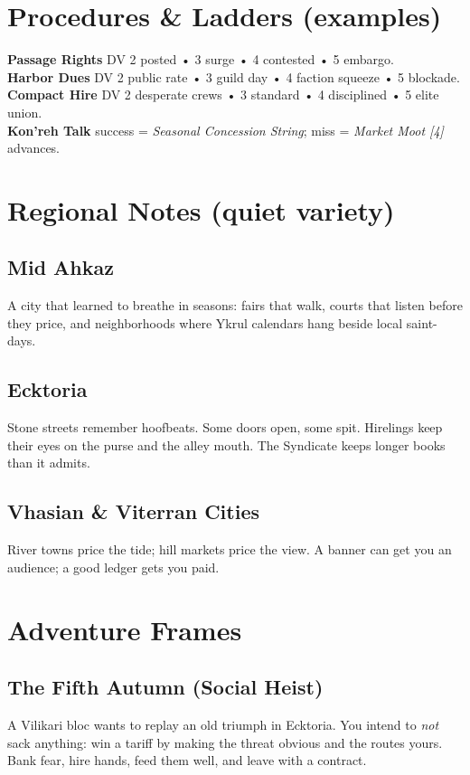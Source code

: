 \documentclass[11pt,letterpaper]{article}
\begin{document}
\section{Procedures \& Ladders (examples)}
\textbf{Passage Rights} DV 2 posted • 3 surge • 4 contested • 5 embargo.\\
\textbf{Harbor Dues} DV 2 public rate • 3 guild day • 4 faction squeeze • 5 blockade.\\
\textbf{Compact Hire} DV 2 desperate crews • 3 standard • 4 disciplined • 5 elite union.\\
\textbf{Kon'reh Talk} success = \emph{Seasonal Concession String}; miss = \emph{Market Moot [4]} advances.

\section{Regional Notes (quiet variety)}
\subsection*{Mid Ahkaz}
A city that learned to breathe in seasons: fairs that walk, courts that listen before they price, and neighborhoods where Ykrul calendars hang beside local saint-days.

\subsection*{Ecktoria}
Stone streets remember hoofbeats. Some doors open, some spit. Hirelings keep their eyes on the purse and the alley mouth. The Syndicate keeps longer books than it admits.

\subsection*{Vhasian \& Viterran Cities}
River towns price the tide; hill markets price the view. A banner can get you an audience; a good ledger gets you paid.

\section{Adventure Frames}
\subsection*{The Fifth Autumn (Social Heist)}
A Vilikari bloc wants to replay an old triumph in Ecktoria. You intend to \emph{not} sack anything: win a tariff by making the threat obvious and the routes yours. Bank fear, hire hands, feed them well, and leave with a contract.
\end{document}
